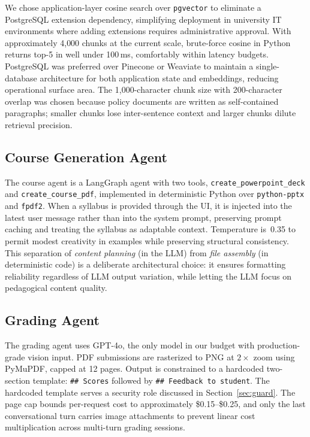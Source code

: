 \documentclass[conference]{IEEEtran}
\begin{document}
We chose application-layer cosine search over \texttt{pgvector} to eliminate a PostgreSQL extension dependency, simplifying deployment in university IT environments where adding extensions requires administrative approval. With approximately 4{,}000 chunks at the current scale, brute-force cosine in Python returns top-5 in well under 100\,ms, comfortably within latency budgets. PostgreSQL was preferred over Pinecone or Weaviate to maintain a single-database architecture for both application state and embeddings, reducing operational surface area. The 1{,}000-character chunk size with 200-character overlap was chosen because policy documents are written as self-contained paragraphs; smaller chunks lose inter-sentence context and larger chunks dilute retrieval precision.

\subsection{Course Generation Agent}

The course agent is a LangGraph agent with two tools, \texttt{create\_powerpoint\_deck} and \texttt{create\_course\_pdf}, implemented in deterministic Python over \texttt{python-pptx} and \texttt{fpdf2}. When a syllabus is provided through the UI, it is injected into the latest user message rather than into the system prompt, preserving prompt caching and treating the syllabus as adaptable context. Temperature is~0.35 to permit modest creativity in examples while preserving structural consistency. This separation of \emph{content planning} (in the LLM) from \emph{file assembly} (in deterministic code) is a deliberate architectural choice: it ensures formatting reliability regardless of LLM output variation, while letting the LLM focus on pedagogical content quality.

\subsection{Grading Agent}

The grading agent uses GPT-4o, the only model in our budget with production-grade vision input. PDF submissions are rasterized to PNG at $2\times$ zoom using PyMuPDF, capped at 12 pages. Output is constrained to a hardcoded two-section template: \texttt{\#\#~Scores} followed by \texttt{\#\#~Feedback~to~student}. The hardcoded template serves a security role discussed in Section~\ref{sec:guard}. The page cap bounds per-request cost to approximately \$0.15--\$0.25, and only the last conversational turn carries image attachments to prevent linear cost multiplication across multi-turn grading sessions.
\end{document}
